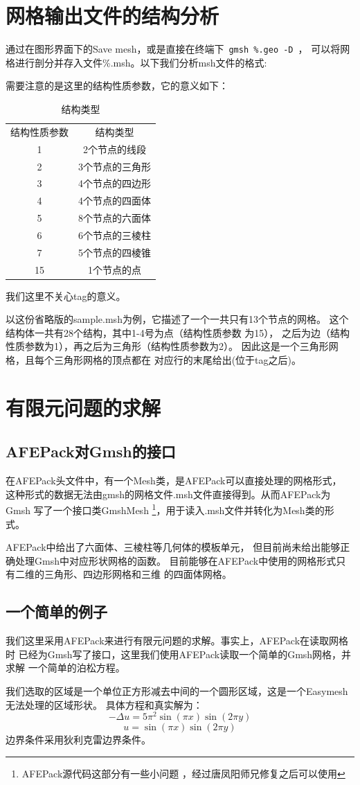 \documentclass[a4paper,  11pt]{ctexart}
\newcommand\inputccode[1]{}
\begin{document}
\section{网格输出文件的结构分析}
通过在图形界面下的Save mesh，或是直接在终端下~\verb|gmsh %.geo -D|~，
可以将网格进行剖分并存入文件\%.msh。以下我们分析msh文件的格式:
\inputccode{sample.msh}
需要注意的是这里的结构性质参数，它的意义如下：
\begin{table}[H]
	\centering
	\begin{tabular}{|c|c|}
		结构性质参数 & 结构类型 \\
		1 & 2个节点的线段 \\
		2 & 3个节点的三角形  \\
		3 & 4个节点的四边形 \\
		4 & 4个节点的四面体 \\
		5 & 8个节点的六面体 \\
		6 & 6个节点的三棱柱 \\
		7 & 5个节点的四棱锥 \\
		15 &  1个节点的点 
	\end{tabular}
	\caption{结构类型}
\end{table}
我们这里不关心tag的意义。

以这份省略版的sample.msh为例，它描述了一个一共只有13个节点的网格。
这个结构体一共有28个结构，其中1-4号为点（结构性质参数
为15），
之后为边（结构性质参数为1），再之后为三角形（结构性质参数为2）。
因此这是一个三角形网格，且每个三角形网格的顶点都在
对应行的末尾给出(位于tag之后)。
\newpage
\section{有限元问题的求解}
\subsection{AFEPack对Gmsh的接口}
在AFEPack头文件中，有一个Mesh类，是AFEPack可以直接处理的网格形式，
这种形式的数据无法由gmsh的网格文件.msh文件直接得到。从而AFEPack为Gmsh
写了一个接口类GmshMesh
\footnote{AFEPack源代码这部分有一些小问题
，经过唐凤阳师兄修复之后可以使用}，用于读入.msh文件并转化为Mesh类的形
式。

AFEPack中给出了六面体、三棱柱等几何体的模板单元，
但目前尚未给出能够正确处理Gmsh中对应形状网格的函数。
目前能够在AFEPack中使用的网格形式只有二维的三角形、四边形网格和三维
的四面体网格。

\subsection{一个简单的例子}
我们这里采用AFEPack来进行有限元问题的求解。事实上，AFEPack在读取网格时
已经为Gmsh写了接口，这里我们使用AFEPack读取一个简单的Gmsh网格，并求解
一个简单的泊松方程。\par
我们选取的区域是一个单位正方形减去中间的一个圆形区域，这是一个Easymesh
无法处理的区域形状。
具体方程和真实解为：
\[
-\Delta u = 5\pi^2\sin(\pi x)\sin(2\pi y)
\]
\[
 u = \sin(\pi x)\sin(2\pi y)
\]
边界条件采用狄利克雷边界条件。
\end{document}
